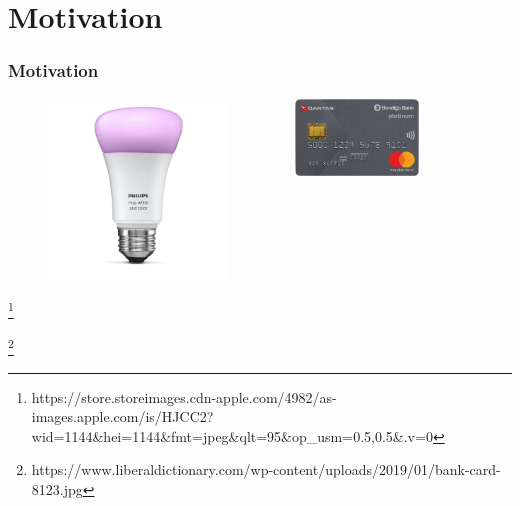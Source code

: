 \documentclass[11pt,t,usepdftitle=false,aspectratio=169]{beamer}
\newcommand\blfootnote[1]{%
  \begingroup
  \renewcommand\thefootnote{}\footnote{#1}%
  \addtocounter{footnote}{-1}%
  \endgroup
}
\begin{document}
\section{Motivation}
\begin{frame}
  \frametitle{Motivation}
  \begin{figure}
    \begin{columns}[T]
      \begin{column}{0.48\textwidth}
        \centering
        \vfill
        \includegraphics[width=0.8\textwidth]{hue.jpeg}
        \vfill
      \end{column}
      \hfill
      \begin{column}{0.48\textwidth}
        \centering
        \vspace{1cm}
        \includegraphics[width=0.7\textwidth]{bank-card.jpg}
        \vfill
      \end{column}
    \end{columns}
  \end{figure}
  \blfootnote{\tiny
https://store.storeimages.cdn-apple.com/4982/as-images.apple.com/is/HJCC2?wid=1144\&hei=1144\&fmt=jpeg\&qlt=95\&op\_usm=0.5,0.5\&.v=0}
  \blfootnote{\tiny
    https://www.liberaldictionary.com/wp-content/uploads/2019/01/bank-card-8123.jpg}
\end{frame}
\end{document}
